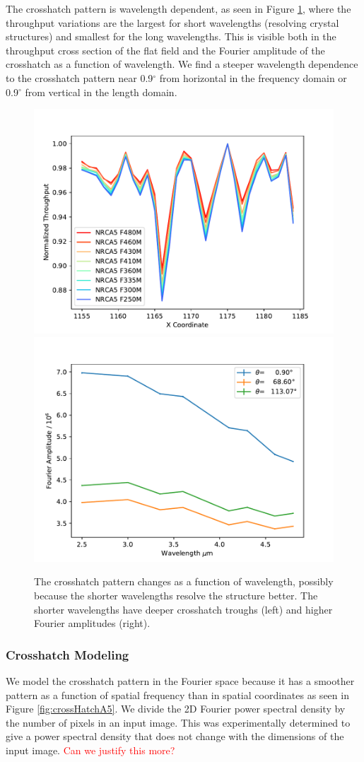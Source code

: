 \documentclass{aastex62}
\newcommand{\degree}{^\circ}
\begin{document}
The crosshatch pattern is wavelength dependent, as seen in Figure \ref{fig:crossHatchWavelengthDep}, where the throughput variations are the largest for short wavelengths (resolving crystal structures) and smallest for the long wavelengths.
This is visible both in the throughput cross section of the flat field and the Fourier amplitude of the crosshatch as a function of wavelength.
We find a steeper wavelength dependence to the crosshatch pattern near 0.9$\degree$ from horizontal in the frequency domain or 0.9$\degree$ from vertical in the length domain.

\begin{figure}[!hbtp]
\centering
\includegraphics[width=.49\columnwidth]{cross_sec_of_crosshatch.pdf}
\includegraphics[width=.49\columnwidth]{fourier_power_from_fit.pdf}
\caption{
The crosshatch pattern changes as a function of wavelength, possibly because the shorter wavelengths resolve the structure better.
The shorter wavelengths have deeper crosshatch troughs (left) and higher Fourier amplitudes (right).
}\label{fig:crossHatchWavelengthDep}
\end{figure}


\subsubsection{Crosshatch Modeling}
We model the crosshatch pattern in the Fourier space because it has a smoother pattern as a function of spatial frequency than in spatial coordinates as seen in Figure \ref{fig:crossHatchA5}.
We divide the 2D Fourier power spectral density by the number of pixels in an input image.
This was experimentally determined to give a power spectral density that does not change with the dimensions of the input image.
\textcolor{red}{Can we justify this more?}
\end{document}

